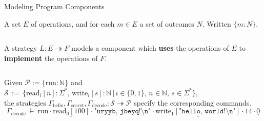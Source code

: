 \documentclass[aspectratio=1610,mathserif]{beamer}
\newcommand{\kw}[1]{\ensuremath{ \mathrm{#1} }}
\begin{document}
\begin{frame}[fragile]{Modeling Program Components} %
  \begin{definition}
    A set $E$ of operations, and for each $m \in E$ a set of outcomes $N$.
    Written $\{ m : N \}$.
  \end{definition}
  \pause \vspace{-1ex}
  \begin{columns}
  \begin{column}{.63\textwidth}%
    \begin{definition}[Strategy]
       A strategy $L : E \twoheadrightarrow F$
       models a component which
       \textbf{uses} the operations of $E$ to
       \textbf{implement} the operations of $F$.
    \end{definition}%
  \end{column}%
  \begin{column}{.3\textwidth}%
    \vspace{1ex}

  \end{column}%
  \end{columns}
  \pause
  \begin{example}
    Given $\mathcal{P} :=  \{ \kw{run} : \mathbb{N} \}$ \pause and
    $\mathcal{S} \, := \, \bigl\{
      \kw{read}_i[n] \mathbin: \Sigma^* , \,
      \kw{write}_i[s] \mathbin: \mathbb{N} \, \mathrel{\big|} \,
      i \in \{0,1\}, \,
      n \in \mathbb{N}, \,
      s \in \Sigma^*
      \bigr\}$, \\
    \pause
    the strategies
    $\Gamma_\kw{hello},
     \Gamma_\kw{secret},
     \Gamma_\kw{decode} : \mathcal{S} \twoheadrightarrow \mathcal{P}$
    specify the corresponding commands.
    \pause
    \[
      \Gamma_\kw{decode} \: \vDash \: \kw{run} \cdot
      \underline{\kw{read}_0[100]} \cdot
      \texttt{"uryyb, jbeyq!\textbackslash{}n"} \cdot
      \underline{\kw{write}_1[\texttt{"hello, world!\textbackslash{}n"}]} \cdot
      14 \cdot
      \underline{0}
    \]
  \end{example}
\end{frame}
\end{document}
